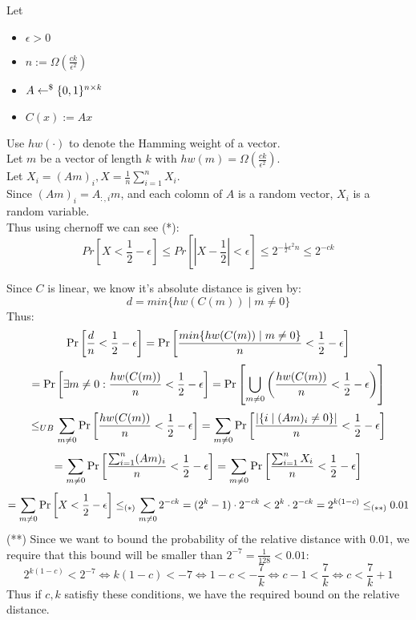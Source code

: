 
Let
\begin{itemize}
    \item $\epsilon>0$
    \item $n:=\Omega(\frac{ck}{\epsilon^2})$
    \item $A\leftarrow^\$\{0,1\}^{n\times k}$
    \item $C(x):=Ax$
\end{itemize}
Use $hw(\cdot)$ to denote the Hamming weight of a vector.\\ 
Let $m$ be a vector of length $k$ with $hw(m)=\Omega(\frac{ck}{\epsilon^2})$.\\
Let $X_i=(Am)_i, X=\frac{1}{n}\sum_{i=1}^nX_i$.\\
Since $(Am)_i=A_{:,i}m$, and each colomn of $A$ is a random vector, $X_i$ is 
a random variable.\\

Thus using chernoff we can see (*):
\[
    Pr\left[X<\frac{1}{2}-\epsilon\right]
    \leq Pr\left[|X-\frac{1}{2}|<\epsilon\right]
    \leq 2^{-\frac{1}{2}\epsilon^2n}
    \leq 2^{-ck}
\]


Since $C$ is linear,
we know it's absolute distance is given by:
\[
    d=min\{hw(C(m))\mid m\neq 0\}
\]
Thus:
\[
    \operatorname*{Pr}\left[\frac{d}{n}<\frac{1}{2}-\epsilon\right]
    =\operatorname*{Pr}\left[\frac{min\{hw(C(m))\mid m\neq 0\}}{n}<\frac{1}{2}-\epsilon\right]
\]\[
    =\operatorname*{Pr}\left[\exists m\neq 0: \frac{hw(C(m))}{n}<\frac{1}{2}-\epsilon\right]
    =\operatorname*{Pr}\left[\bigcup_{m\neq 0}\left(\frac{hw(C(m))}{n}<\frac{1}{2}-\epsilon\right)\right]
\]
\[
    \leq_{UB}\sum_{m\neq 0}\operatorname*{Pr}\left[\frac{hw(C(m))}{n}<\frac{1}{2}-\epsilon\right] 
    =\sum_{m\neq 0}\operatorname*{Pr}\left[\frac{|\{i\mid (Am)_i\neq 0\}|}{n}<\frac{1}{2}-\epsilon\right]  
\]
\[
    =\sum_{m\neq 0}\operatorname*{Pr}\left[\frac{\sum_{i=1}^n (Am)_i}{n}<\frac{1}{2}-\epsilon\right]  
    =\sum_{m\neq 0}\operatorname*{Pr}\left[\frac{\sum_{i=1}^nX_i}{n}<\frac{1}{2}-\epsilon\right]  
\]
\[
    =\sum_{m\neq 0}\operatorname*{Pr}\left[X<\frac{1}{2}-\epsilon\right]  
    \leq_{(*)}\sum_{m\neq 0}2^{-ck}
    =(2^k-1)\cdot2^{-ck}
    <2^k\cdot2^{-ck}
    =2^{k(1-c)}\leq_{(**)}0.01
\]
(**) Since we want to bound the probability of the relative distance 
with $0.01$, we require that this bound will be smaller than $2^{-7}=\frac{1}{128}<0.01$:
\[
    2^{k(1-c)}<2^{-7}
    \Leftrightarrow k(1-c)<-7
    \Leftrightarrow 1-c<-\frac{7}{k}
    \Leftrightarrow c-1<\frac{7}{k}
    \Leftrightarrow c<\frac{7}{k}+1
\]
Thus if $c,k$ satisfiy these conditions, we have the required
bound on the relative distance.